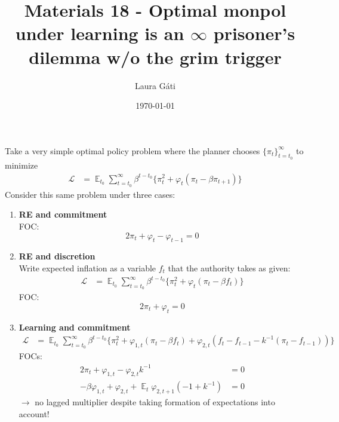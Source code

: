 \documentclass[11pt]{article}
\renewcommand{\[}{\begin{equation}}
\renewcommand{\]}{\end{equation}}
\DeclareMathOperator{\E}{\mathbb{E}}
\begin{document}
\linespread{1.0}

\title{Materials 18 - Optimal monpol under learning is an $\infty$ prisoner's dilemma w/o the grim trigger}
\author{Laura G\'ati} 
\date{\today}
\maketitle





Take a very simple optimal policy problem where the planner chooses $\{\pi_t\}_{t=t_0}^{\infty}$ to minimize
\begin{align}
\mathcal{L} &= \E_{t_0}\sum_{t=t_0}^{\infty} \beta^{t-t_0}\bigg\{ \pi_t^2  + \varphi_{t} (\pi_t - \beta \pi_{t+1} ) \bigg\} \label{commitment}
 \end{align}
 Consider this same problem under three cases:
 \begin{enumerate}
 \item \textbf{RE and commitment} \\
 FOC:
 \begin{equation}
 2\pi_t +\varphi_t - \varphi_{t-1} = 0 \label{FOCcommitment}
 \end{equation}

 \item \textbf{RE and discretion} \\
 Write expected inflation as a variable $f_t$ that the authority takes as given:
\begin{align}
\mathcal{L} &= \E_{t_0}\sum_{t=t_0}^{\infty} \beta^{t-t_0}\bigg\{ \pi_t^2  + \varphi_{t} (\pi_t - \beta f_t) \bigg\} \label{discretion}
 \end{align}
FOC:
 \begin{equation}
 2\pi_t +\varphi_t = 0 \label{FOCdiscretion}
 \end{equation}
 \item \textbf{Learning and commitment} 
 \begin{align}
\mathcal{L} &= \E_{t_0}\sum_{t=t_0}^{\infty} \beta^{t-t_0}\bigg\{ \pi_t^2  + \varphi_{1,t} (\pi_t - \beta f_t) + \varphi_{2,t}(f_t - f_{t-1} -k^{-1}(\pi_t - f_{t-1})) \bigg\} \label{learning}
 \end{align}
 FOCs:
 \begin{align}
  2\pi_t +\varphi_{1,t} -\varphi_{2,t}k^{-1} & = 0 \label{FOC1learn} \\
  -\beta\varphi_{1,t} + \varphi_{2,t} + \E_{t}\varphi_{2,t+1}(-1 + k^{-1})  & = 0 \label{FOC2learn} 
 \end{align}
$\rightarrow$ no lagged multiplier despite taking formation of expectations into account!
 \end{enumerate}
 
\end{document}
